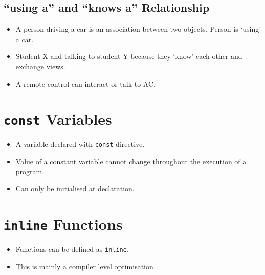 \documentclass[12pt,a4paper]{article}
\begin{document}
\subsection{``using a'' and ``knows a'' Relationship}
\begin{itemize}
\item A person driving a car is an association between two objects. Person is `using' a car.
\item Student X and talking to student Y because they `know' each other and exchange views.
\item A remote control can interact or talk to AC.
\end{itemize}
\section{\texttt{const} Variables}
\begin{itemize}
\item A variable declared with \verb|const| directive.
\item Value of a constant variable cannot change throughout the execution of a program.
\item Can only be initialised at declaration.
\end{itemize}
\section{\texttt{inline} Functions}
\begin{itemize}
\item Functions can be defined as \verb|inline|.
\item This is mainly a compiler level optimisation.
\end{itemize}
\end{document}
